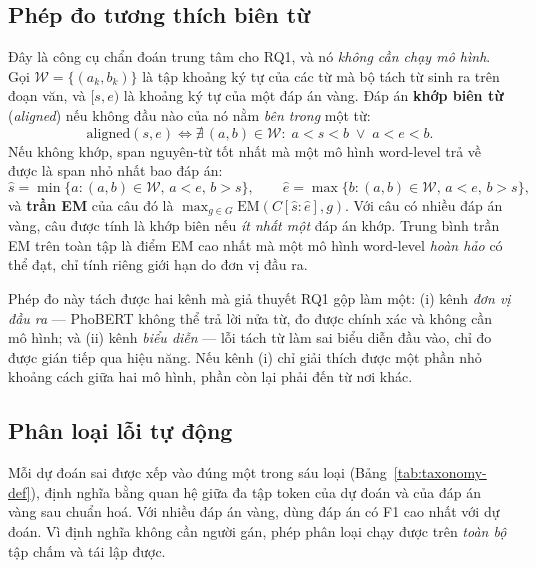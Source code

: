 \subsection{Phép đo tương thích biên từ}
\label{sec:alignment}

Đây là công cụ chẩn đoán trung tâm cho RQ1, và nó \emph{không cần chạy mô hình}. Gọi
$\mathcal{W} = \{(a_k, b_k)\}$ là tập khoảng ký tự của các từ mà bộ tách từ sinh ra trên đoạn
văn, và $[s, e)$ là khoảng ký tự của một đáp án vàng. Đáp án \textbf{khớp biên từ}
(\emph{aligned}) nếu không đầu nào của nó nằm \emph{bên trong} một từ:
\begin{equation}
  \mathrm{aligned}(s, e) \iff \nexists\, (a, b) \in \mathcal{W}:\; a < s < b \;\lor\; a < e < b .
\end{equation}
Nếu không khớp, span nguyên-từ tốt nhất mà một mô hình word-level trả về được là span nhỏ nhất
bao đáp án:
\begin{equation}
  \hat{s} = \min\{a : (a,b)\in\mathcal{W},\, a < e,\, b > s\}, \qquad
  \hat{e} = \max\{b : (a,b)\in\mathcal{W},\, a < e,\, b > s\},
\end{equation}
và \textbf{trần EM} của câu đó là $\max_{g \in G} \mathrm{EM}(C[\hat{s}{:}\hat{e}], g)$. Với câu
có nhiều đáp án vàng, câu được tính là khớp biên nếu \emph{ít nhất một} đáp án khớp. Trung bình
trần EM trên toàn tập là điểm EM cao nhất mà một mô hình word-level \emph{hoàn hảo} có thể đạt,
chỉ tính riêng giới hạn do đơn vị đầu ra.

Phép đo này tách được hai kênh mà giả thuyết RQ1 gộp làm một: (i) kênh \emph{đơn vị đầu ra} ---
PhoBERT không thể trả lời nửa từ, đo được chính xác và không cần mô hình; và (ii) kênh \emph{biểu
diễn} --- lỗi tách từ làm sai biểu diễn đầu vào, chỉ đo được gián tiếp qua hiệu năng. Nếu kênh (i)
chỉ giải thích được một phần nhỏ khoảng cách giữa hai mô hình, phần còn lại phải đến từ nơi khác.

\subsection{Phân loại lỗi tự động}
\label{sec:taxonomy}

Mỗi dự đoán sai được xếp vào đúng một trong sáu loại (Bảng~\ref{tab:taxonomy-def}), định nghĩa
bằng quan hệ giữa đa tập token của dự đoán và của đáp án vàng sau chuẩn hoá. Với nhiều đáp án
vàng, dùng đáp án có F1 cao nhất với dự đoán. Vì định nghĩa không cần người gán, phép phân loại
chạy được trên \emph{toàn bộ} tập chấm và tái lập được.

